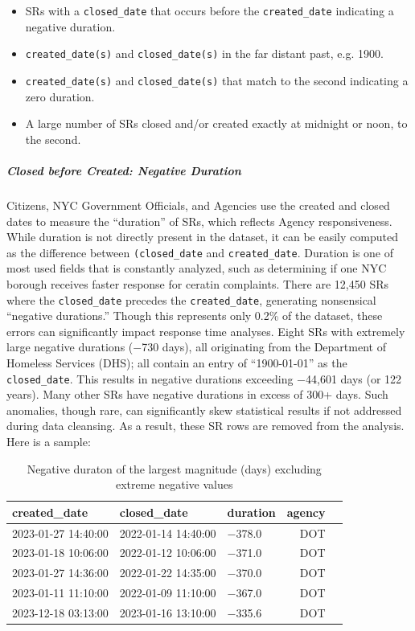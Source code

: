 \documentclass[linenumber]{jdsart}
\begin{document}
\begin{itemize}
    \item SRs with a \texttt{closed\_date} that occurs before the 
    \texttt{created\_date} indicating a negative duration.
    \item \texttt{created\_date(s)} and \texttt{closed\_date(s)} in 
    the far distant past, e.g. 1900.
    \item \texttt{created\_date(s)} and \texttt{closed\_date(s)} that 
    match to the second indicating a zero duration.
    \item A large number of SRs closed and/or created exactly at midnight 
    or noon, to the second.
\end{itemize}


\subparagraph{Closed before Created: Negative Duration}
Citizens, NYC Government Officials, and Agencies use the created and 
closed dates to measure the ``duration'' of SRs, which reflects Agency 
responsiveness. While duration is not directly present in the dataset, 
it can be easily computed as the difference between
\texttt{(closed\_date} and \texttt{created\_date}.  Duration is one of 
most used fields that is constantly analyzed, such as determining if 
one NYC borough receives faster response for ceratin 
complaints. There are 12,450 SRs where the \texttt{closed\_date} precedes the 
\texttt{created\_date}, generating nonsensical ``negative durations.'' 
Though this represents only 0.2\% of the dataset, these errors can 
significantly impact response time analyses. Eight SRs with extremely 
large negative durations ($-$730 days), all originating from the 
Department of Homeless Services (DHS); all contain an entry 
of ``1900-01-01'' as the \texttt{closed\_date}. This results 
in negative durations exceeding $-$44,601 days (or 122 years). Many
other SRs have negative durations in excess of 300+ days. Such 
anomalies, though rare, can significantly skew statistical results if 
not addressed during data cleansing. As a result, these SR rows are 
removed from the analysis. Here is a sample:

\begin{table}[tbp]
  \centering
  \caption{Negative duraton of the largest magnitude (days) excluding
    extreme negative values}
  \begin{tabular}{l l l r l}
    \toprule
    {created\_date} & {closed\_date} & {duration} 
    & \textbf{agency} \\
    \midrule
    2023-01-27 14:40:00 & 2022-01-14 14:40:00 & $-$378.0 & DOT \\
    2023-01-18 10:06:00 & 2022-01-12 10:06:00 & $-$371.0 & DOT \\
    2023-01-27 14:36:00 & 2022-01-22 14:35:00 & $-$370.0 & DOT \\
    2023-01-11 11:10:00 & 2022-01-09 11:10:00 & $-$367.0 & DOT \\
    2023-12-18 03:13:00 & 2023-01-16 13:10:00 & $-$335.6 & DOT \\
    \bottomrule
  \end{tabular}
  \label{tab:largest-errors}
\end{table}
\end{document}
